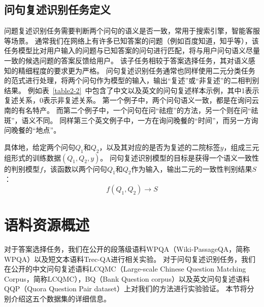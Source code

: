 

\subsection{问句复述识别任务定义}

问题复述识别任务需要判断两个问句的语义是否一致，常用于搜索引擎，智能客服等场景。
通常我们在网络上有许多已知答案的问题（例如百度知道，知乎等），该任务模型比对用户输入的问题与已知答案的问句进行匹配，将与用户问句语义尽量一致的候选问题的答案反馈给用户。
该子任务相较于答案选择任务，其对语义感知的精细程度的要求更为严格。
问句复述识别任务通常也同样使用二元分类任务的范式进行处理，将两个问句作为模型的输入，输出“复述”或“非复述”的二相判别结果。
例如表~\ref{table2-2}~中包含了中文以及英文的问句复述样本示例，其中1表示复述关系，0表示非复述关系。
第一个例子中，两个问句语义一致，都是在询问云南的有名特产。
而第二个例子中，一个问句在问“祛痘”的方法，另一个则在问“祛斑”，语义不同。
同样第三个英文例子中，一方在询问晚餐的“时间”，而另一方询问晚餐的“地点”。

具体地，给定两个问句$Q_1$和$Q_2$，以及其对应的是否为复述的二院标签$y$，组成三元组形式的训练数据$(Q_1, Q_2, y)$。
问句复述识别模型的目标是获得一个语义一致性的判别模型$f$，该函数以两个问句$Q_1$和$Q_2$作为输入，输出二元的一致性判别结果$S$：
\begin{equation}
    f(Q_1, Q_2) \rightarrow S
\end{equation}




\section{语料资源概述}
\label{2.2 语料资源概述}

对于答案选择任务，我们在公开的段落级语料WPQA（Wiki-PassageQA，简称WPQA）\cite{cohen2018wikipassageqa}以及短文本语料Trec-QA\cite{wang2007jeopardy}进行相关实验。
对于问句复述识别任务，我们在公开的中文问句复述语料LCQMC（Large-scale Chinese Question Matching Corpus，简称LCQMC）\cite{liu2018lcqmc}，BQ（Bank Question corpus）\cite{chen2018bq}以及英文问句复述语料QQP（Quora Question Pair dataset）\cite{shankar2017first}上对我们的方法进行实验验证。
本节将分别介绍这五个数据集的详细信息。


